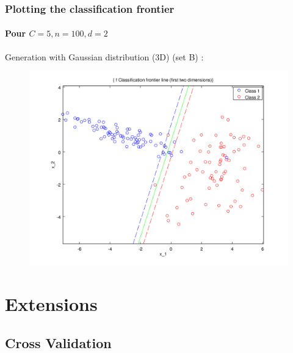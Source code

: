 \documentclass{beamer}
\begin{document}
\begin{frame}
\frametitle{Plotting the \textbf{classification frontier}}
\framesubtitle{Pour $C = 5, n = 100, d = 2$}

Generation with Gaussian distribution (3D) (set B) :

         \begin{figure}
         \centering
         \includegraphics[scale=0.4]{images/image2.png}
         \end{figure}

\end{frame}

\section{Extensions}

\subsection{Cross Validation}

\begin{frame}
\tableofcontents[currentsubsection]
\end{frame}
\end{document}
